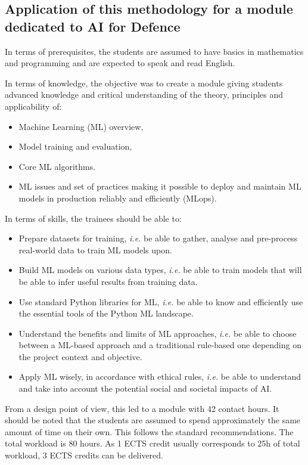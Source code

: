 \documentclass[conference]{IEEEtran}
\begin{document}
\subsection{Application of this methodology for a module dedicated to AI for Defence}
In terms of prerequisites, the students are assumed to have basics in mathematics and programming and are expected to speak and read English.

\noindent In terms of knowledge, the objective was to create a module giving students advanced knowledge and critical understanding of the theory, principles and applicability of: 
\begin{itemize}
    \item Machine Learning (ML) overview,
    \item Model training and evaluation, 
\item Core ML algorithms. 
\item 
ML issues and set of practices making it possible to deploy and maintain ML models in production reliably and efficiently (MLops).
\end{itemize}
In terms of skills, the trainees should be able to: 
\begin{itemize}
    \item Prepare datasets for training, \textit{i.e.} be able to gather, analyse and pre-process real-world data to train ML models upon. 
\item Build ML models on various data types, \textit{i.e.} be able to train models that will be able to infer useful results from training data. 
\item Use standard Python libraries for ML, \textit{i.e.} be able to know and efficiently use the essential tools of the Python ML landscape. 
\item Understand the benefits and limits of ML approaches, \textit{i.e.} be able to choose between a ML-based approach and a traditional rule-based one depending on the project context and objective. 
\item Apply ML wisely, in accordance with ethical rules, \textit{i.e.} be able to understand and take into account the potential social and societal impacts of AI. 
\end{itemize}
From a design point of view, this led to a module with 42 contact hours. It should be noted that the students are assumed to spend approximately the same amount of time on their own. This follows the standard recommendations. The total workload is 80 hours. As 1 ECTS credit usually corresponds to 25h of total workload, 3 ECTS credits can be delivered.
\end{document}
